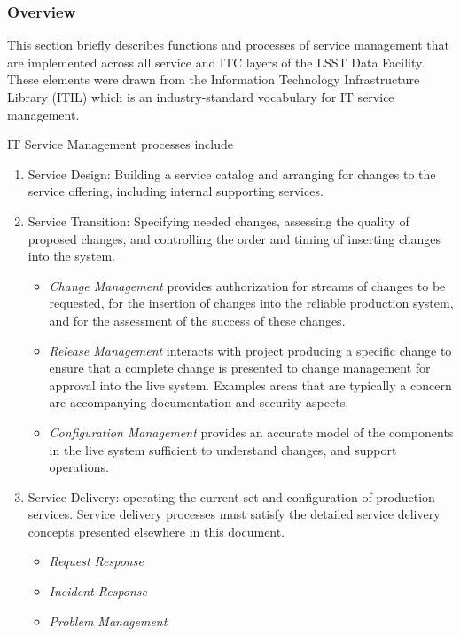 \subsubsection{Overview}
This section briefly describes functions and processes of service management that are implemented across all service and ITC layers of the LSST Data Facility. These elements were drawn from the Information Technology Infrastructure Library (ITIL) which is an industry-standard vocabulary for IT service management.

IT Service Management processes include

\begin{enumerate}

\item Service Design: Building a service catalog and arranging for changes to the service offering, including internal supporting services.

\item Service Transition: Specifying needed changes, assessing the quality of proposed changes,
and controlling the order and timing of inserting changes into the system.

  \begin{itemize}

  \item \emph{Change Management} provides authorization for streams of changes to be requested, for the insertion of changes into the reliable production system, and for the assessment of the success of these changes.

  \item \emph{Release Management} interacts with project producing a specific change to ensure that
a complete change is presented to change management for approval into the live system. Examples areas that are typically a concern are accompanying documentation and security aspects.

  \item \emph{Configuration Management} provides an accurate model of the components in the live system sufficient to understand changes, and support operations.

  \end{itemize}

\item Service Delivery: operating the current set and configuration of production services. Service delivery processes must satisfy the detailed service delivery concepts presented elsewhere in this document.

  \begin{itemize}

  \item \emph{Request Response}

  \item \emph{Incident Response}

  \item \emph{Problem Management}

  \end{itemize}

\end{enumerate}
